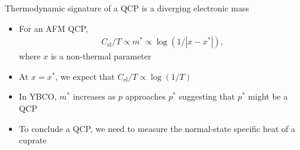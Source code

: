 \documentclass{beamer}
\begin{document}
\begin{frame}{Thermodynamic signature of a QCP is a diverging electronic mass}
\begin{itemize}
\item For an AFM QCP,
\begin{align}
C_{\text{el}}/T \propto m^{\ast} \propto \log{(1/|x - x^{\ast}|)},
\end{align}
where $x$ is a non-thermal parameter
\item At $x = x^{\ast}$, we expect that $C_{\text{el}}/T \propto \log{(1/T)}$
\item In YBCO, $m^{\ast}$ increases as $p$ approaches $p^{\ast}$ suggesting that $p^{\ast}$ might be a QCP\footnotemark
\item To conclude a QCP, we need to measure the normal-state specific heat of a cuprate
\end{itemize}
\end{frame}
\end{document}
